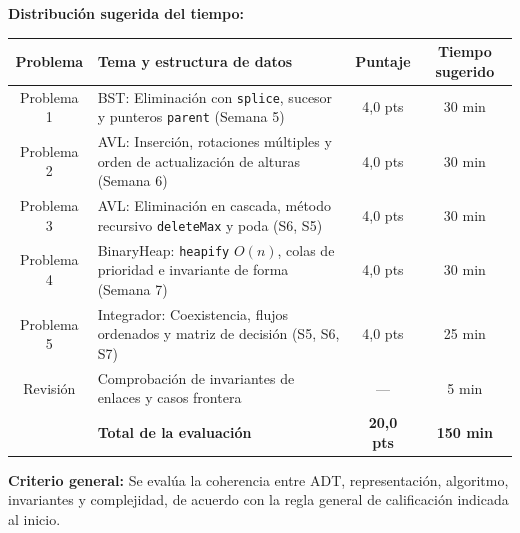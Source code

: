\documentclass[10pt,a4paper]{article}
\begin{document}
\vspace{6pt}
\begin{tcolorbox}[enhanced,sharp corners,colback=black!3,colframe=black!70,boxrule=0.4pt,left=5pt,right=5pt,top=3pt,bottom=3pt]
\scriptsize
\textbf{Distribución sugerida del tiempo:}
\begin{center}
\begin{tabularx}{\textwidth}{cXcc}
\toprule
\textbf{Problema} & \textbf{Tema y estructura de datos} & \textbf{Puntaje} & \textbf{Tiempo sugerido} \\
\midrule
Problema 1 & BST: Eliminación con \texttt{splice}, sucesor y punteros \texttt{parent} (Semana 5) & 4,0 pts & 30 min \\
Problema 2 & AVL: Inserción, rotaciones múltiples y orden de actualización de alturas (Semana 6) & 4,0 pts & 30 min \\
Problema 3 & AVL: Eliminación en cascada, método recursivo \texttt{deleteMax} y poda (S6, S5) & 4,0 pts & 30 min \\
Problema 4 & BinaryHeap: \texttt{heapify} $O(n)$, colas de prioridad e invariante de forma (Semana 7) & 4,0 pts & 30 min \\
Problema 5 & Integrador: Coexistencia, flujos ordenados y matriz de decisión (S5, S6, S7) & 4,0 pts & 25 min \\
Revisión   & Comprobación de invariantes de enlaces y casos frontera & --- & 5 min \\
\midrule
 & \textbf{Total de la evaluación} & \textbf{20,0 pts} & \textbf{150 min} \\
\bottomrule
\end{tabularx}
\end{center}
\textbf{Criterio general:} Se evalúa la coherencia entre ADT, representación, algoritmo, invariantes y complejidad, de acuerdo con la regla general de calificación indicada al inicio.
\end{tcolorbox}
\end{document}
